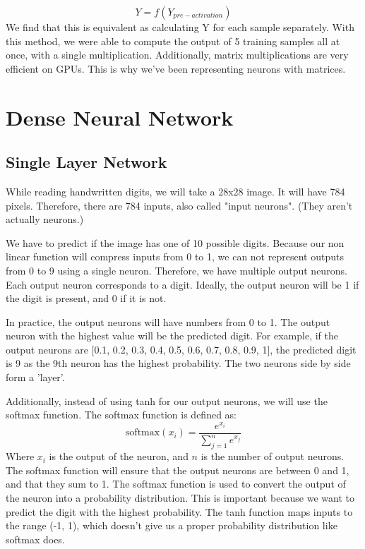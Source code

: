 \documentclass[12pt,a4paper]{article}
\begin{document}
\[
Y = f(Y_{pre-activation})
\]
We find that this is equivalent as calculating Y for each sample separately. With this method, we were able to compute the output of 5 training samples all at once, with a single multiplication. Additionally, matrix multiplications are very efficient on GPUs. This is why we've been representing neurons with matrices.

\section{Dense Neural Network}
\subsection{Single Layer Network}
While reading handwritten digits, we will take a 28x28 image. It will have 784 pixels. Therefore, there are 784 inputs, also called "input neurons". (They aren't actually neurons.)

We have to predict if the image has one of 10 possible digits. Because our non linear function will compress inputs from 0 to 1, we can not represent outputs from 0 to 9 using a single neuron. Therefore, we have multiple output neurons. Each output neuron corresponds to a digit. Ideally, the output neuron will be 1 if the digit is present, and 0 if it is not.

In practice, the output neurons will have numbers from 0 to 1. The output neuron with the highest value will be the predicted digit. For example, if the output neurons are [0.1, 0.2, 0.3, 0.4, 0.5, 0.6, 0.7, 0.8, 0.9, 1], the predicted digit is 9 as the 9th neuron has the highest probability. The two neurons side by side form a 'layer'.

Additionally, instead of using tanh for our output neurons, we will use the softmax function. The softmax function is defined as:
\[
    \text{softmax}(x_i) = \frac{e^{x_i}}{\sum_{j=1}^{n} e^{x_j}}
\]
Where $x_i$ is the output of the neuron, and $n$ is the number of output neurons. The softmax function will ensure that the output neurons are between 0 and 1, and that they sum to 1.
The softmax function is used to convert the output of the neuron into a probability distribution. This is important because we want to predict the digit with the highest probability. The tanh function maps inputs to the range (-1, 1), which doesn't give us a proper probability distribution like softmax does.
\end{document}
